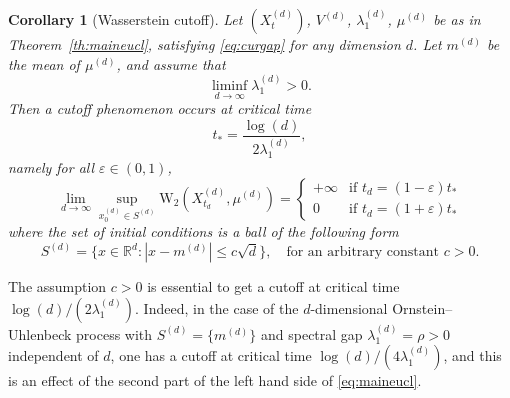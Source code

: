 \documentclass[10pt,reqno]{amsart}
\newtheorem{corollary}[theorem]{Corollary}
\numberwithin{equation}{section}
\begin{document}
\begin{corollary}[Wasserstein cutoff] \label{cor_cutoff_langevin_general} %
  Let $(X_t^{(d)})$, $V^{(d)}$, $\lambda_1^{(d)}$, $\mu^{(d)}$ be as in
  Theorem~\ref{th:maineucl}, satisfying \eqref{eq:curgap} for any dimension
  $d$. Let $m^{(d)}$ be the mean of $\mu^{(d)}$, and assume that
  \begin{equation}
    \liminf_{d\to\infty}\lambda_1^{(d)} > 0.
  \end{equation}
  Then a cutoff phenomenon occurs at critical time
  \begin{equation}
    t_*=\frac{\log(d)}{2\lambda_1^{(d)}},
  \end{equation}
  namely for all
  $\varepsilon\in(0,1)$,
  \begin{equation}
    \lim_{d\to\infty}
    \sup_{x^{(d)}_0\in S^{(d)}}
    \mathrm{W}_2(X^{(d)}_{t_d},\mu^{(d)})
    =
    \begin{cases}\label{eq:cutoff:W2}
      +\infty & \text{if $t_d=(1-\varepsilon)t_*$}\\
      0 & \text{if $t_d=(1+\varepsilon)t_*$}
    \end{cases}
  \end{equation}
  where the set of initial conditions is a ball of the following form
  \begin{equation}
    S^{(d)}=\{x\in\mathbb{R}^d:|x-m^{(d)}|\leq c\sqrt{d}\},\quad\text{for an arbitrary constant $c>0$}.
  \end{equation}
\end{corollary}

\bigskip

The assumption $c>0$ is essential to get a cutoff at critical time
$\log(d)/(2\lambda_1^{(d)})$. Indeed, in the case of the $d$-dimensional
Ornstein--Uhlenbeck process with $S^{(d)}=\{m^{(d)}\}$ and spectral gap
$\lambda_1^{(d)}=\rho>0$ independent of $d$, one has a cutoff
at critical time $\log(d)/(4\lambda_1^{(d)})$, and this is an effect of the
second part of the left hand side of \eqref{eq:maineucl}.

\bigskip
\end{document}
